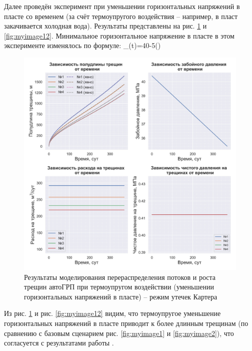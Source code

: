 Далее проведён эксперимент при уменьшении горизонтальных напряжений в пласте со временем (за счёт термоупругого воздействия -- например, в пласт закачивается холодная вода).
Результаты представлены на рис. \ref{fig:myimage11} и \ref{fig:myimage12}.
Минимальное горизонтальное напряжение в пласте в этом эксперименте изменялось по формуле:
\beq
\sigma_{}(t)=40-5\cdot\left(\right)
\eeq

\begin{figure}[H] 
\center
\includegraphics[width=\linewidth]{images/myimage11.jpg}
\caption{Результаты моделирования перераспределения потоков и роста трещин автоГРП при термоупругом воздействии (уменьшении горизонтальных напряжений в пласте) -- режим утечек Картера}
\label{fig:myimage11}
\end{figure}

Из рис. \ref{fig:myimage11} и рис. \ref{fig:myimage12} видим, что термоупругое уменьшение горизонтальных напряжений в пласте  приводит к более длинным трещинам (по сравнению с базовым сценарием рис. \ref{fig:myimage1} и \ref{fig:myimage2}), что согласуется с результатами работы \cite{perkins_gonzalez}.

